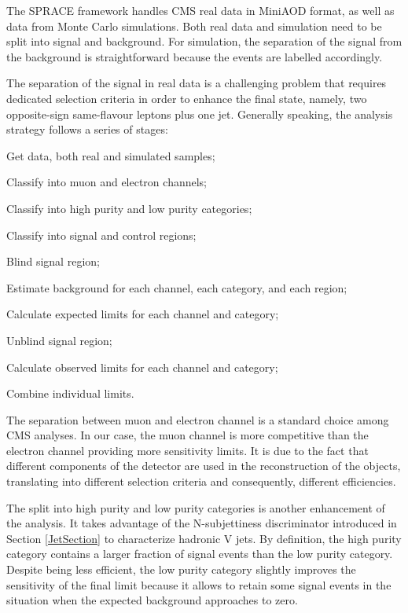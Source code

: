 
The SPRACE framework handles CMS real data in MiniAOD format, as well as data from Monte Carlo simulations. Both real data and simulation need to be split into signal and background. For simulation, the separation of the signal from the background is straightforward because the events are labelled accordingly.

The separation of the signal in real data is a challenging problem that requires dedicated selection criteria in order to enhance the final state, namely, two opposite-sign same-flavour leptons plus one jet. Generally speaking, the analysis strategy follows a series of stages:

\begin{compact_enumerate}
	\item Get data, both real and simulated samples;
	\item Classify into muon and electron channels;
	\item Classify into high purity and low purity categories;
	\item Classify into signal and control regions;
	\item Blind signal region;
	\item Estimate background for each channel, each category, and each region;
	\item Calculate expected limits for each channel and category;
	\item Unblind signal region;
	\item Calculate observed limits for each channel and category;
	\item Combine individual limits. 
\end{compact_enumerate}

The separation between muon and electron channel is a standard choice among CMS analyses. In our case, the muon channel is more competitive than the electron channel providing more sensitivity limits. It is due to the fact that different components of the detector are used in the reconstruction of the objects, translating into different selection criteria and consequently, different efficiencies. 

The split into high purity and low purity categories is another enhancement of the analysis. It takes advantage of the N-subjettiness discriminator introduced in Section \ref{JetSection} to characterize hadronic V jets. By definition, the high purity category contains a larger fraction of signal events than the low purity category. Despite being less efficient, the low purity category slightly improves the sensitivity of the final limit because it allows to retain some signal events in the situation when the expected background approaches to zero. %


